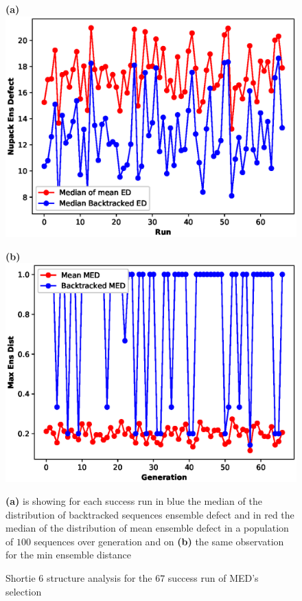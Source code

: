 \documentclass[english,12pt,a4paper]{article}
\theoremstyle{definition}
\begin{document}
\begin{figure}[H] 
	\vspace{-0.5cm}
	\hspace{-1.2cm}
	\begin{minipage}{0.60\textwidth}
		\centering
		\textbf{(a)}\label{Fig:small1}
		\includegraphics[width=.9\linewidth]{images/41-2/2/stat1-48}
	\end{minipage}\hfill
	\begin{minipage}{0.6\textwidth}
		\centering
		
		\textbf{(b)}\label{Fig:small2}
		\includegraphics[width=.9\linewidth]{images/41-2/2/stat4-48}
	\end{minipage}
	
	\caption{Shortie 6 structure analysis for the $67$ success run of  MED's selection}\label{Fig:SUM2}
	\medskip
	\small
	\textbf{(a)} is showing for each success run in blue the median of the distribution of backtracked sequences ensemble defect and in red the median of the distribution of mean ensemble defect in a population of $100$  sequences over generation and on  \textbf{(b)} the same observation for the min ensemble distance 
	

\end{figure}
\end{document}

